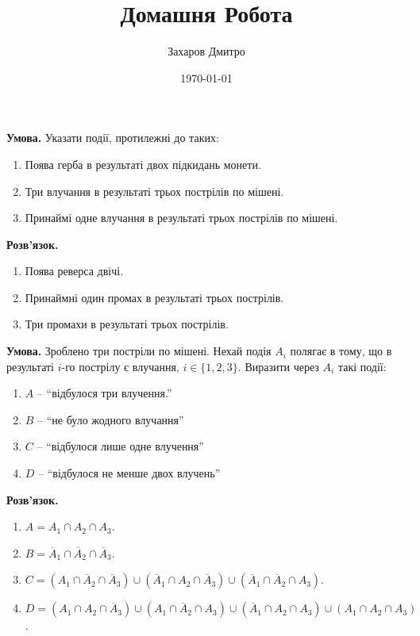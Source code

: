 \documentclass[oneside,solution]{karazin-prob-theory-assign}
\title{Домашня Робота}
\author{Захаров Дмитро}
\date{\today}
\begin{document}
\maketitle



\hspace{20px}\textbf{Умова.} Указати події, протилежні до таких:
\begin{enumerate}
    \item Поява герба в результаті двох підкидань монети.
    \item Три влучання в результаті трьох пострілів по мішені.
    \item Принаймі одне влучання в результаті трьох пострілів по мішені.
\end{enumerate}

\textbf{Розв'язок.}
\begin{enumerate}
    \item Поява реверса двічі.
    \item Принаймні один промах в результаті трьох пострілів.
    \item Три промахи в результаті трьох пострілів.
\end{enumerate}


\hspace{20px}\textbf{Умова.} Зроблено три постріли по мішені. Нехай подія $A_i$ полягає в тому, що в результаті $i$-го пострілу є влучання, $i \in \{1,2,3\}$. Виразити через $A_i$ такі події:
\begin{enumerate}
    \item $A$ -- ``відбулося три влучення.''
    \item $B$ -- ``не було жодного влучання''
    \item $C$ -- ``відбулося лише одне влучення''
    \item $D$ -- ``відбулося не менше двох влучень''
\end{enumerate}

\textbf{Розв'язок.}
\begin{enumerate}
    \item $A = A_1 \cap A_2 \cap A_3$.
    \item $B = \overline{A}_1 \cap \overline{A}_2 \cap \overline{A}_3$.
    \item $C = (A_1 \cap \overline{A}_2 \cap \overline{A}_3) \cup (\overline{A}_1 \cap A_2 \cap \overline{A}_3) \cup (\overline{A}_1 \cap \overline{A}_2 \cap A_3)$.
    \item $D = (A_1 \cap A_2 \cap \overline{A}_3) \cup (A_1 \cap \overline{A}_2 \cap A_3) \cup (\overline{A}_1 \cap A_2 \cap A_3) \cup (A_1 \cap A_2 \cap A_3)$.
\end{enumerate}
\end{document}
